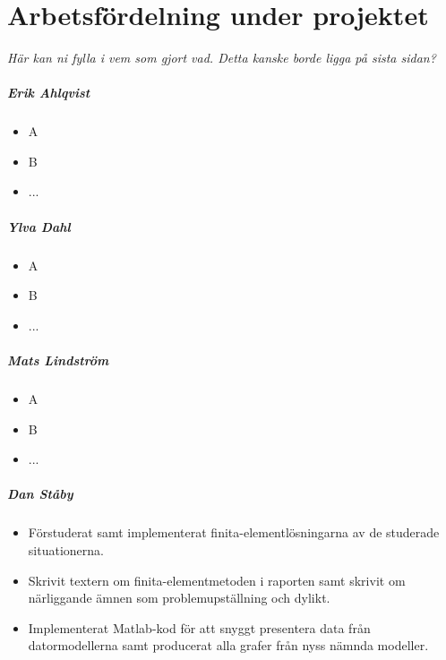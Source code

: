 \chapter{Arbetsfördelning under projektet}

\emph{\color{red}Här kan ni fylla i vem som gjort vad. Detta kanske borde ligga på sista sidan?}

\paragraph{Erik Ahlqvist}
\begin{itemize}
\item A
\item B
\item ...
\end{itemize}

\paragraph{Ylva Dahl}
\begin{itemize}
\item A
\item B
\item ...
\end{itemize}

\paragraph{Mats Lindström}
\begin{itemize}
\item A
\item B
\item ...
\end{itemize}

\paragraph{Dan Ståby}
\begin{itemize}
\item Förstuderat samt implementerat finita-elementlösningarna av de studerade situationerna.
\item Skrivit textern om finita-elementmetoden i raporten samt skrivit om närliggande ämnen som problemupställning och dylikt. 
\item Implementerat Matlab-kod för att snyggt presentera data från datormodellerna samt producerat alla grafer från
nyss nämnda modeller.
\end{itemize}
